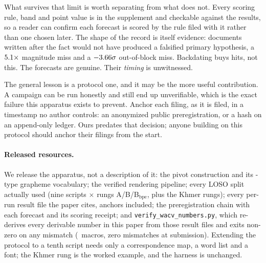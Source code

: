What survives that limit is worth separating from what does not. Every scoring rule, band and point
value is in the supplement and checkable against the results, so a reader can confirm each forecast
is scored by the rule filed with it rather than one chosen later. The shape of the record is itself
evidence: documents written after the fact would not have produced a falsified primary hypothesis, a
$5.1\times$ magnitude miss and a $-3.66\sigma$ out-of-block miss. Backdating
buys hits, not this. The forecasts are genuine. Their \emph{timing} is unwitnessed.

The general lesson is a protocol one, and it may be the more useful contribution. A campaign can be
run honestly and still end up unverifiable, which is the exact failure this apparatus exists to
prevent. Anchor each filing, as it is filed, in a timestamp no author controls: an anonymized
public preregistration, or a hash on an append-only ledger. Ours predates that decision; anyone
building on this protocol should anchor their filings from the start.

\paragraph{Released resources.} We release the apparatus, not a description of it: the pivot
construction and its \pivotTypes-type grapheme vocabulary; the verified rendering pipeline; every
LOSO split actually used (nine scripts $\times$ rungs A/B/B$_{\mathrm{bpe}}$, plus the Khmer
rungs); every per-run result file the paper cites, anchors included; the preregistration chain
with each forecast and its scoring receipt; and \texttt{verify\_wacv\_numbers.py}, which
re-derives every derivable number in this paper from those result files and exits non-zero on any
mismatch (\verifyMacros\ macros, zero mismatches at submission). Extending the protocol to a tenth
script needs only a correspondence map, a word list and a font; the Khmer rung is the worked
example, and the harness is unchanged.
